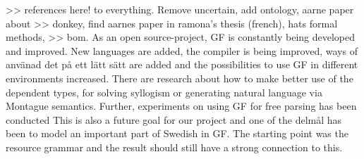 \documentclass{report}
\begin{document}
\vspace{5mm}
>> references here! to everything. Remove uncertain, add ontology, aarne paper about
>> donkey, find aarnes paper in ramona's thesis (french), hats formal methods,
>> bom.
As an open source-project, GF is constantly being developed and improved. New
languages are added, the compiler is being improved, ways of använad det på ett
lätt sätt are added and the possibilities to use GF in different environments
increased. There are  research about how to make better use of the dependent
types, for solving syllogism or generating natural language via Montague
semantics.
Further, experiments on using GF for free parsing has been conducted \cite[]{gfMech} 
This is also a future goal for our project and one of the delmål has been to
model an important part of Swedish in GF. The starting point was the resource
grammar and the result should still have a strong connection to this.

%
%

\end{document}
